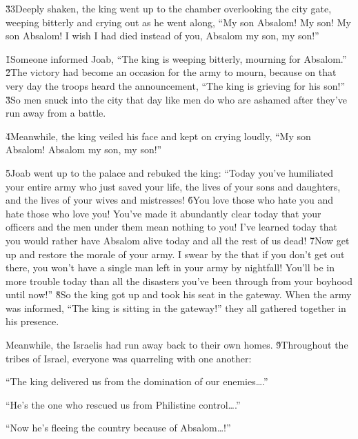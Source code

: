 \v{33}Deeply shaken, the king went up to the chamber overlooking the city gate, weeping bitterly and crying out as he went along, ``My son Absalom! My son! My son Absalom! I wish I had died instead of you, Absalom my son, my son!''

\v{1}Someone informed Joab, ``The king is weeping bitterly, mourning for Absalom.'' \v{2}The victory had become an occasion for the army to mourn, because on that very day the troops heard the announcement, ``The king is grieving for his son!'' \v{3}So men snuck into the city that day like men do who are ashamed after they've run away from a battle.

\v{4}Meanwhile, the king veiled his face and kept on crying loudly, ``My son Absalom! Absalom my son, my son!''

\v{5}Joab went up to the palace and rebuked the king: ``Today you've humiliated your entire army who just saved your life, the lives of your sons and daughters, and the lives of your wives and mistresses! \v{6}You love those who hate you and hate those who love you! You've made it abundantly clear today that your officers and the men under them mean nothing to you! I've learned today that you would rather have Absalom alive today and all the rest of us dead! \v{7}Now get up and restore the morale of your army. I swear by the  that if you don't get out there, you won't have a single man left in your army by nightfall! You'll be in more trouble today than all the disasters you've been through from your boyhood until now!'' \v{8}So the king got up and took his seat in the gateway. When the army was informed, ``The king is sitting in the gateway!'' they all gathered together in his presence.

Meanwhile, the Israelis had run away back to their own homes. \v{9}Throughout the tribes of Israel, everyone was quarreling with one another:

``The king delivered us from the domination of our enemies{\ldots}.''

``He's the one who rescued us from Philistine control{\ldots}.''

``Now he's fleeing the country because of Absalom{\ldots}!''


